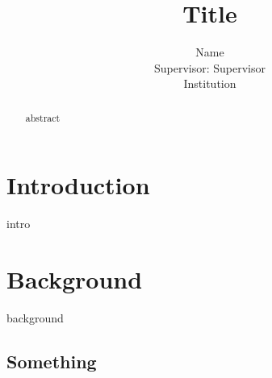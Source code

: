 \documentclass[a4paper,10pt]{extarticle}
\title{Title}
\author{Name\\Supervisor: Supervisor\\{\small Institution}}
\begin{document}
	\maketitle
	\begin{abstract}
abstract
	\end{abstract}
	\thispagestyle{empty}
	{\hypersetup{linkcolor=black}
		\tableofcontents}
	\pagebreak
	\flushbottom
	\section{Introduction}
intro
	\section{Background}
	background
	\subsection{Something}
\end{document}
